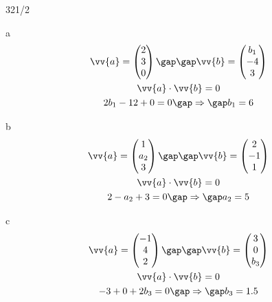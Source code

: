 \begin{exercise}{321/2}
  \item [a]
  \begin{gather*}
    \vv{a} = \begin{pmatrix}2 \\ 3 \\ 0\end{pmatrix} \gap\gap \vv{b} = \begin{pmatrix}b_1 \\ -4 \\ 3\end{pmatrix} \\
    \vv{a} \cdot \vv{b} = 0 \\
    2b_1 - 12 + 0 = 0 \gap\Rightarrow\gap b_1 = 6
  \end{gather*}
  \item [b]
  \begin{gather*}
    \vv{a} = \begin{pmatrix}1 \\ a_2 \\ 3\end{pmatrix} \gap\gap \vv{b} = \begin{pmatrix}2 \\ -1 \\ 1\end{pmatrix} \\
    \vv{a} \cdot \vv{b} = 0 \\
    2 - a_2 + 3 = 0 \gap\Rightarrow\gap a_2 = 5
  \end{gather*}
  \item [c]
  \begin{gather*}
    \vv{a} = \begin{pmatrix}-1 \\ 4 \\ 2\end{pmatrix} \gap\gap \vv{b} = \begin{pmatrix}3 \\ 0 \\ b_3\end{pmatrix} \\
    \vv{a} \cdot \vv{b} = 0 \\
    -3 + 0 + 2b_3 = 0 \gap\Rightarrow\gap b_3 = 1.5
  \end{gather*}
\end{exercise}
